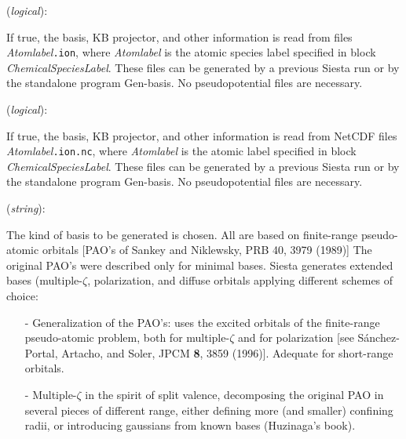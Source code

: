 \documentclass[11pt]{article}
\begin{document}
\begin{description}
\itemsep 10pt
\parsep 0pt
\item[{\bf User.Basis}] ({\it logical}): 

If true, the basis, KB projector, and other information is read from
files {\it Atomlabel}{\tt .ion}, where {\it Atomlabel} is the atomic
species label specified in block {\it ChemicalSpeciesLabel}. These
files can be generated by a previous {\sc Siesta} run or by the
standalone program {\sc Gen-basis}. No pseudopotential
files are necessary.

\item[{\bf User.Basis.NetCDF}] ({\it logical}): 

If true, the basis, KB projector, and other information is read from
NetCDF files {\it Atomlabel}{\tt .ion.nc}, where {\it Atomlabel} is
the atomic label specified in block {\it ChemicalSpeciesLabel}. These
files can be generated by a previous {\sc Siesta} run or by the
standalone program {\sc Gen-basis}. No pseudopotential
files are necessary.


\item[{\bf PAO.BasisType}] ({\it string}): 

The kind of basis to be generated is chosen. All are based on
finite-range pseudo-atomic orbitals [PAO's of Sankey and Niklewsky, PRB 40, 3979 (1989)] The
original PAO's were described only for minimal bases. {\sc Siesta}
generates extended bases (multiple-$\zeta$,
polarization, and diffuse
orbitals applying different schemes of choice:

\begin{itemize}

\item[-] Generalization of the PAO's: uses the excited orbitals of the
finite-range pseudo-atomic problem, both for multiple-$\zeta$ and for
polarization [see S\'anchez-Portal, Artacho, and Soler, JPCM {\bf 8},
3859 (1996)]. Adequate for short-range orbitals.

\item[-] Multiple-$\zeta$ in the spirit of split valence, decomposing the original PAO in several pieces of different
range, either defining more (and smaller) confining radii, or
introducing gaussians from known bases (Huzinaga's
book).
\end{itemize}


\end{description}
\end{document}
